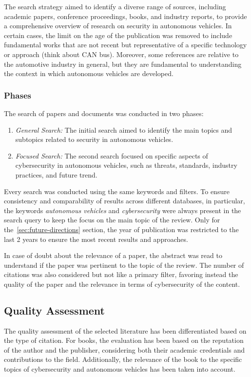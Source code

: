 The search strategy aimed to identify a diverse range of sources, including academic papers, conference proceedings, books, and industry reports, to provide a comprehensive overview of research on security in autonomous vehicles.
In certain cases, the limit on the age of the publication was removed to include fundamental works that are not recent but representative of a specific technology or approach (think about CAN bus).
Moreover, some references are relative to the automotive industry in general, but they are fundamental to understanding the context in which autonomous vehicles are developed.

\subsubsection{Phases}\label{subsubsec:phases}
The search of papers and documents was conducted in two phases:
\begin{enumerate}
    \item \textit{General Search:} The initial search aimed to identify the main topics and subtopics related to security in autonomous vehicles.
    \item \textit{Focused Search:} The second search focused on specific aspects of cybersecurity in autonomous vehicles, such as threats, standards, industry practices, and future trend.
\end{enumerate}

Every search was conducted using the same keywords and filters.
To ensure consistency and comparability of results across different databases, in particular, the keywords \textit{autonomous vehicles} and \textit{cybersecurity} were always present in the search query to keep the focus on the main topic of the review.
Only for the~\ref{sec:future-directions} section, the year of publication was restricted to the last 2 years to ensure the most recent results and approaches.

In case of doubt about the relevance of a paper, the abstract was read to understand if the paper was pertinent to the topic of the review.
The number of citations was also considered but not like a primary filter, favoring instead the quality of the paper and the relevance in terms of cybersecurity of the content.


\subsection{Quality Assessment}\label{subsec:quality-assessment}
The quality assessment of the selected literature has been differentiated based on the type of citation.
For books, the evaluation has been based on the reputation of the author and the publisher, considering both their academic credentials and contributions to the field.
Additionally, the relevance of the book to the specific topics of cybersecurity and autonomous vehicles has been taken into account.

